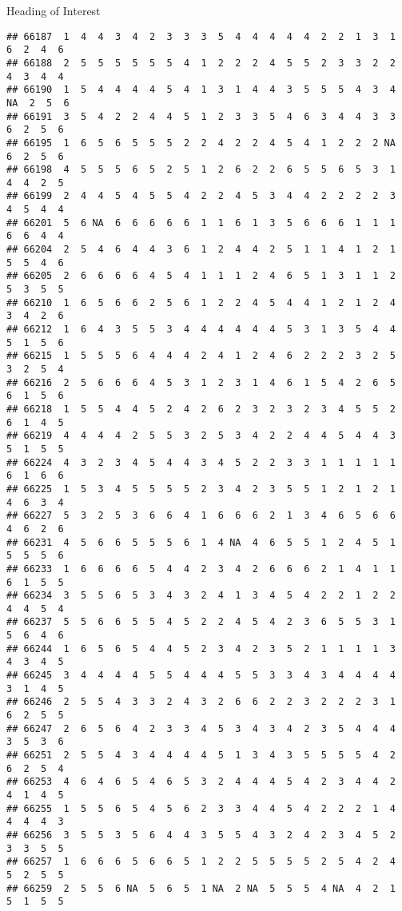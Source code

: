 \documentclass[
  ignorenonframetext,
]{beamer}
\begin{document}
\begin{frame}[fragile]{Heading of Interest}
\begin{verbatim}
## 66187  1  4  4  3  4  2  3  3  3  5  4  4  4  4  4  2  2  1  3  1  6  2  4  6
## 66188  2  5  5  5  5  5  5  4  1  2  2  2  4  5  5  2  3  3  2  2  4  3  4  4
## 66190  1  5  4  4  4  4  5  4  1  3  1  4  4  3  5  5  5  4  3  4 NA  2  5  6
## 66191  3  5  4  2  2  4  4  5  1  2  3  3  5  4  6  3  4  4  3  3  6  2  5  6
## 66195  1  6  5  6  5  5  5  2  2  4  2  2  4  5  4  1  2  2  2 NA  6  2  5  6
## 66198  4  5  5  5  6  5  2  5  1  2  6  2  2  6  5  5  6  5  3  1  4  4  2  5
## 66199  2  4  4  5  4  5  5  4  2  2  4  5  3  4  4  2  2  2  2  3  4  5  4  4
## 66201  5  6 NA  6  6  6  6  6  1  1  6  1  3  5  6  6  6  1  1  1  6  6  4  4
## 66204  2  5  4  6  4  4  3  6  1  2  4  4  2  5  1  1  4  1  2  1  5  5  4  6
## 66205  2  6  6  6  6  4  5  4  1  1  1  2  4  6  5  1  3  1  1  2  5  3  5  5
## 66210  1  6  5  6  6  2  5  6  1  2  2  4  5  4  4  1  2  1  2  4  3  4  2  6
## 66212  1  6  4  3  5  5  3  4  4  4  4  4  4  5  3  1  3  5  4  4  5  1  5  6
## 66215  1  5  5  5  6  4  4  4  2  4  1  2  4  6  2  2  2  3  2  5  3  2  5  4
## 66216  2  5  6  6  6  4  5  3  1  2  3  1  4  6  1  5  4  2  6  5  6  1  5  6
## 66218  1  5  5  4  4  5  2  4  2  6  2  3  2  3  2  3  4  5  5  2  6  1  4  5
## 66219  4  4  4  4  2  5  5  3  2  5  3  4  2  2  4  4  5  4  4  3  5  1  5  5
## 66224  4  3  2  3  4  5  4  4  3  4  5  2  2  3  3  1  1  1  1  1  6  1  6  6
## 66225  1  5  3  4  5  5  5  5  2  3  4  2  3  5  5  1  2  1  2  1  4  6  3  4
## 66227  5  3  2  5  3  6  6  4  1  6  6  6  2  1  3  4  6  5  6  6  4  6  2  6
## 66231  4  5  6  6  5  5  5  6  1  4 NA  4  6  5  5  1  2  4  5  1  5  5  5  6
## 66233  1  6  6  6  6  5  4  4  2  3  4  2  6  6  6  2  1  4  1  1  6  1  5  5
## 66234  3  5  5  6  5  3  4  3  2  4  1  3  4  5  4  2  2  1  2  2  4  4  5  4
## 66237  5  5  6  6  5  5  4  5  2  2  4  5  4  2  3  6  5  5  3  1  5  6  4  6
## 66244  1  6  5  6  5  4  4  5  2  3  4  2  3  5  2  1  1  1  1  3  4  3  4  5
## 66245  3  4  4  4  4  5  5  4  4  4  5  5  3  3  4  3  4  4  4  4  3  1  4  5
## 66246  2  5  5  4  3  3  2  4  3  2  6  6  2  2  3  2  2  2  3  1  6  2  5  5
## 66247  2  6  5  6  4  2  3  3  4  5  3  4  3  4  2  3  5  4  4  4  3  5  3  6
## 66251  2  5  5  4  3  4  4  4  4  5  1  3  4  3  5  5  5  5  4  2  6  2  5  4
## 66253  4  6  4  6  5  4  6  5  3  2  4  4  4  5  4  2  3  4  4  2  4  1  4  5
## 66255  1  5  5  6  5  4  5  6  2  3  3  4  4  5  4  2  2  2  1  4  4  4  4  3
## 66256  3  5  5  3  5  6  4  4  3  5  5  4  3  2  4  2  3  4  5  2  3  3  5  5
## 66257  1  6  6  6  5  6  6  5  1  2  2  5  5  5  5  2  5  4  2  4  5  2  5  5
## 66259  2  5  5  6 NA  5  6  5  1 NA  2 NA  5  5  5  4 NA  4  2  1  5  1  5  5

\end{verbatim}
\end{frame}
\end{document}
